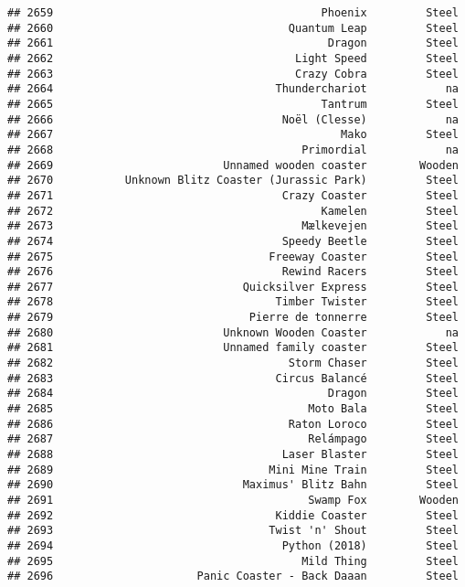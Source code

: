\documentclass[
]{article}
\begin{document}
\begin{verbatim}
## 2659                                         Phoenix         Steel
## 2660                                    Quantum Leap         Steel
## 2661                                          Dragon         Steel
## 2662                                     Light Speed         Steel
## 2663                                     Crazy Cobra         Steel
## 2664                                  Thunderchariot            na
## 2665                                         Tantrum         Steel
## 2666                                   Noël (Clesse)            na
## 2667                                            Mako         Steel
## 2668                                      Primordial            na
## 2669                          Unnamed wooden coaster        Wooden
## 2670           Unknown Blitz Coaster (Jurassic Park)         Steel
## 2671                                   Crazy Coaster         Steel
## 2672                                         Kamelen         Steel
## 2673                                      Mælkevejen         Steel
## 2674                                   Speedy Beetle         Steel
## 2675                                 Freeway Coaster         Steel
## 2676                                   Rewind Racers         Steel
## 2677                             Quicksilver Express         Steel
## 2678                                  Timber Twister         Steel
## 2679                              Pierre de tonnerre         Steel
## 2680                          Unknown Wooden Coaster            na
## 2681                          Unnamed family coaster         Steel
## 2682                                    Storm Chaser         Steel
## 2683                                  Circus Balancé         Steel
## 2684                                          Dragon         Steel
## 2685                                       Moto Bala         Steel
## 2686                                    Raton Loroco         Steel
## 2687                                       Relámpago         Steel
## 2688                                   Laser Blaster         Steel
## 2689                                 Mini Mine Train         Steel
## 2690                             Maximus' Blitz Bahn         Steel
## 2691                                       Swamp Fox        Wooden
## 2692                                  Kiddie Coaster         Steel
## 2693                                 Twist 'n' Shout         Steel
## 2694                                   Python (2018)         Steel
## 2695                                      Mild Thing         Steel
## 2696                      Panic Coaster - Back Daaan         Steel

\end{verbatim}
\end{document}
